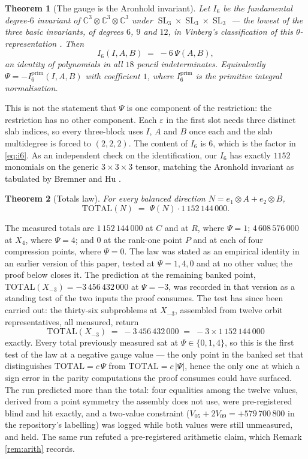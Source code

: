 \documentclass[11pt,reqno]{amsart}
\theoremstyle{plain}
\newtheorem{theorem}{Theorem}[section]
\theoremstyle{definition}
\DeclareMathOperator{\SL}{SL}
\newcommand{\bC}{\mathbb{C}}
\begin{document}
\begin{theorem}[The gauge is the Aronhold invariant]\label{thm:gauge}
Let $I_6$ be the fundamental degree-$6$ invariant of
$\bC^{3}\otimes\bC^{3}\otimes\bC^{3}$ under
$\SL_3\times\SL_3\times\SL_3$ --- the lowest of the three basic invariants, of
degrees $6$, $9$ and $12$, in Vinberg's classification of this
$\theta$-representation \cite{Nur,BHO}.  Then
\begin{equation}\label{eq:i6}
  I_6(I,A,B)\;=\;-6\,\Psi(A,B),
\end{equation}
an identity of polynomials in all $18$ pencil indeterminates.  Equivalently
$\Psi=-I_6^{\mathrm{prim}}(I,A,B)$ with coefficient $1$, where
$I_6^{\mathrm{prim}}$ is the primitive integral normalisation.
\end{theorem}

This is not the statement that $\Psi$ is one component of the restriction: the
restriction has no other component.  Each $\varepsilon$ in the first slot needs
three distinct slab indices, so every three-block uses $I$, $A$ and $B$ once
each and the slab multidegree is forced to $(2,2,2)$.  The content of $I_6$ is
$6$, which is the factor in \eqref{eq:i6}.  As an independent check on the
identification, our $I_6$ has exactly $1152$ monomials on the generic
$3\times3\times3$ tensor, matching the Aronhold invariant as tabulated by
Bremner and Hu \cite{BHO}.

\begin{theorem}[Totals law]\label{thm:totals}
For every balanced direction $N=e_1\otimes A+e_2\otimes B$,
\[
  \mathrm{TOTAL}(N)\;=\;\Psi(N)\cdot 1\,152\,144\,000 .
\]
\end{theorem}

The measured totals are $1\,152\,144\,000$ at $C$ and at $R$, where $\Psi=1$;
$4\,608\,576\,000$ at $X_4$, where $\Psi=4$; and $0$ at the rank-one point $P$
and at each of four compression points, where $\Psi=0$.  The law was stated as
an empirical identity in an earlier version of this paper, tested at
$\Psi=1,4,0$ and at no other value; the proof below closes it.  The prediction
at the remaining banked point, $\mathrm{TOTAL}(X_{-3})=-3\,456\,432\,000$ at
$\Psi=-3$, was recorded in that version as a standing test of the two inputs
the proof consumes.  The test has since been carried out: the thirty-six
subproblems at $X_{-3}$, assembled from twelve orbit representatives, all
measured, return
\[
  \mathrm{TOTAL}(X_{-3})\;=\;-3\,456\,432\,000\;=\;-3\times1\,152\,144\,000
\]
exactly.  Every total previously measured sat at $\Psi\in\{0,1,4\}$, so this
is the first test of the law at a negative gauge value --- the only point in
the banked set that distinguishes $\mathrm{TOTAL}=c\,\Psi$ from
$\mathrm{TOTAL}=c\,|\Psi|$, hence the only one at which a sign error in the
parity computations the proof consumes could have surfaced.  The run predicted
more than the total: four equalities among the twelve values, derived from a
point symmetry the assembly does not use, were pre-registered blind and hit
exactly, and a two-value constraint ($V_{05}+2V_{09}=+579\,700\,800$ in the
repository's labelling) was logged while both values were still unmeasured,
and held.  The same run refuted a pre-registered arithmetic claim, which
Remark \ref{rem:arith} records.
\end{document}
